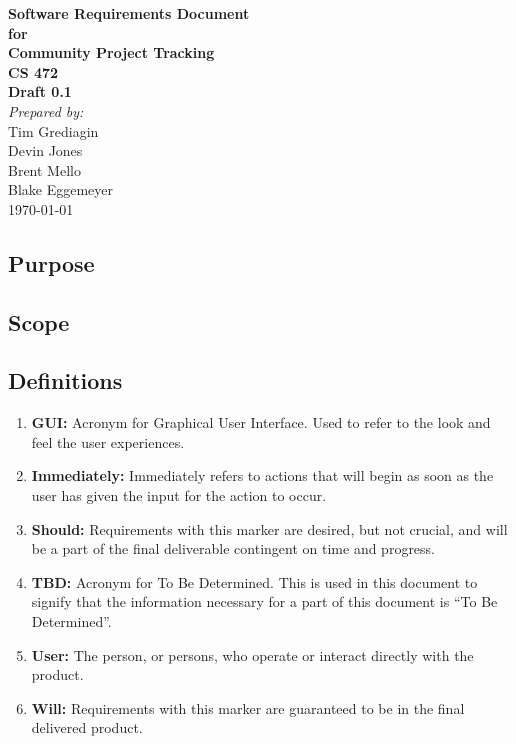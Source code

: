\documentclass[12pt,a4paper]{article}
\begin{document}
\begin{titlepage}
\begin{flushright} 
{\LARGE \bfseries Software Requirements Document}\\[1.2cm]
{\large \bfseries for}\\[1.2cm]
{\huge \bfseries Community Project Tracking}\\[1.2cm]
{\large \bfseries CS 472}\\
\vfill
{\large \bfseries Draft 0.1}\\[2cm]
\emph{Prepared by:} \\
Tim Grediagin\\
Devin Jones\\
Brent Mello\\
Blake Eggemeyer \\ [3cm]
{\large \today}
\end{flushright}
\end{titlepage}
\setcounter{tocdepth}{3}
\setcounter{secnumdepth}{4}
\tableofcontents
\newpage
\subsection{Purpose}


\subsection{Scope}



\subsection{Definitions}
\begin{enumerate}
\item \textbf{GUI:} Acronym for Graphical User Interface. Used to refer to the look and feel the user experiences.
\item \textbf{Immediately:} Immediately refers to actions that will begin as soon as the user has given the input for the action to occur.
\item \textbf{Should:} Requirements with this marker are desired, but not crucial, and will be a part of the final deliverable contingent on time and progress.
\item \textbf{TBD:} Acronym for To Be Determined. This is used in this document to signify that the information necessary for a part of this document is ``To Be Determined''.
\item \textbf{User:} The person, or persons, who operate or interact directly with the product.
\item \textbf{Will:} Requirements with this marker are guaranteed to be in the final delivered product.
\end{enumerate}
\end{document}

